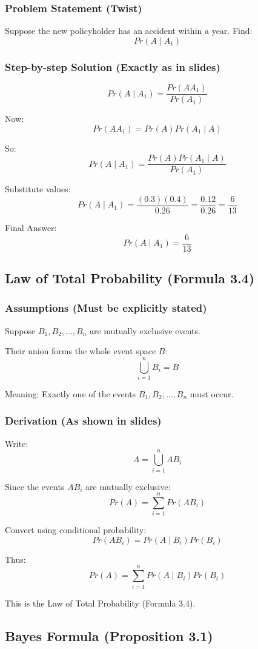 \documentclass{article}
\begin{document}
\subsubsection*{Problem Statement (Twist)}
Suppose the new policyholder has an accident within a year. Find:
\[
Pr(A\mid A_1)
\]

\subsubsection*{Step-by-step Solution (Exactly as in slides)}
\[
Pr(A\mid A_1)=\frac{Pr(AA_1)}{Pr(A_1)}
\]

Now:
\[
Pr(AA_1)=Pr(A)Pr(A_1\mid A)
\]

So:
\[
Pr(A\mid A_1)=\frac{Pr(A)Pr(A_1\mid A)}{Pr(A_1)}
\]

Substitute values:
\[
Pr(A\mid A_1)=\frac{(0.3)(0.4)}{0.26}
=\frac{0.12}{0.26}
=\frac{6}{13}
\]

Final Answer:
\[
Pr(A\mid A_1)=\frac{6}{13}
\]

\subsection{Law of Total Probability (Formula 3.4)}

\subsubsection*{Assumptions (Must be explicitly stated)}
Suppose $B_1,B_2,\dots,B_n$ are mutually exclusive events.

Their union forms the whole event space $B$:
\[
\bigcup_{i=1}^{n}B_i=B
\]

Meaning: Exactly one of the events $B_1,B_2,\dots,B_n$ must occur.

\subsubsection*{Derivation (As shown in slides)}
Write:
\[
A=\bigcup_{i=1}^{n}AB_i
\]

Since the events $AB_i$ are mutually exclusive:
\[
Pr(A)=\sum_{i=1}^{n}Pr(AB_i)
\]

Convert using conditional probability:
\[
Pr(AB_i)=Pr(A\mid B_i)Pr(B_i)
\]

Thus:
\[
Pr(A)=\sum_{i=1}^{n}Pr(A\mid B_i)Pr(B_i)
\]

This is the Law of Total Probability (Formula 3.4).

\subsection{Bayes Formula (Proposition 3.1)}
\end{document}
